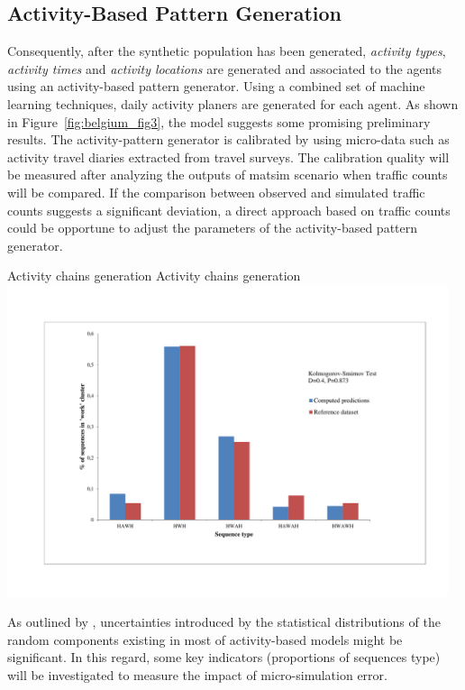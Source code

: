 \subsection{Activity-Based Pattern Generation}
Consequently, after the synthetic population has been generated, \emph{activity types}, \emph{activity times} and \emph{activity locations} are generated and associated to the agents using an activity-based pattern generator. 
Using a combined set of machine learning techniques, daily activity planers are generated for each agent. 
As shown in Figure~\ref{fig:belgium_fig3}, the model suggests some promising preliminary results. The activity-pattern generator is calibrated by using micro-data such as activity travel diaries extracted from travel surveys. 
The calibration quality will be measured after analyzing the outputs of \gls{matsim} scenario when traffic counts will be compared. 
If the comparison between observed and simulated traffic counts suggests a significant deviation, a direct approach based on traffic counts \citep[][]{CoolsEtAl_TRR_2010} could be opportune to adjust the parameters of the activity-based pattern generator.

\createfigure%
{Activity chains generation}%
{Activity chains generation}%
{\label{fig:belgium_fig3}}%
{\includegraphics[width=0.97\textwidth, angle=0]{scenarios/figures/belgium_fig3.pdf}}%
{}

As outlined by \citet[][]{CoolsEtAl_TRB_2011}, uncertainties introduced by the statistical distributions of the random components existing in most of activity-based models might be significant. 
In this regard, some key indicators (\eg proportions of sequences type) will be investigated to measure the impact of micro-simulation error.


